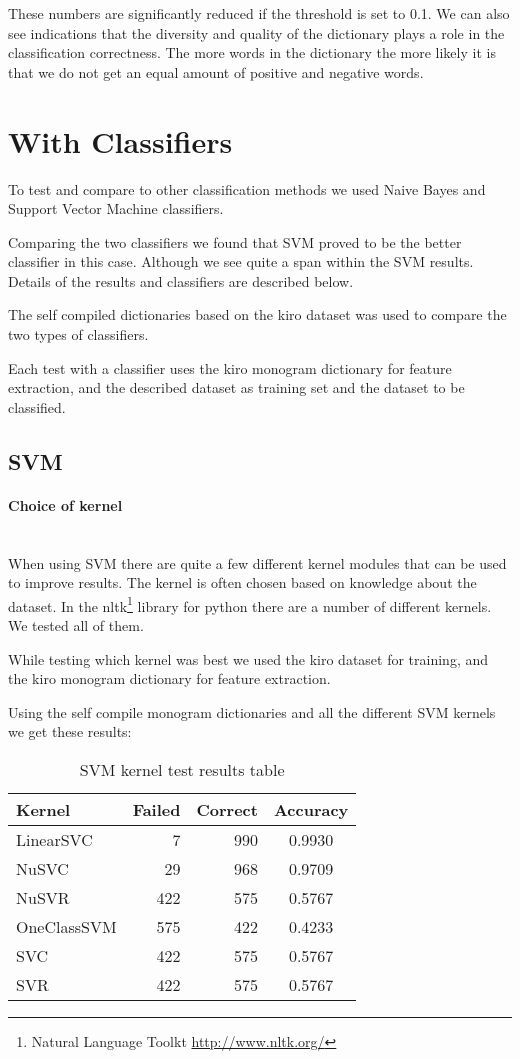 These numbers are significantly reduced if the threshold is set to 0.1.
We can also see indications that the diversity and quality of the dictionary
plays a role in the classification correctness. The more words in the
dictionary the more likely it is that we do not get an equal amount of positive
and negative words. 
%

\section{With Classifiers}\label{sentiment:classifier_classification}
To test and compare to other classification methods we used Naive Bayes and
Support Vector Machine classifiers. 

Comparing the two classifiers we found that SVM proved to be the better
classifier in this case. Although we see quite a span within the SVM results.
Details of the results and classifiers are described below.  

The self compiled dictionaries based on the kiro dataset was used to compare
the two types of classifiers. 

Each test with a classifier uses the kiro monogram dictionary for feature
extraction, and the described dataset as training set and the dataset to be
classified. 

\subsection{SVM}\label{sentiment:svm_classification}
\paragraph{Choice of kernel}
\hspace{0pt}\\
When using SVM there are quite a few different kernel modules that can be used
to improve results. The kernel is often chosen based on knowledge about the
dataset. In the nltk\footnote{Natural Language Toolkt
\url{http://www.nltk.org/}} library for python there are a number of different
kernels. We tested all of them.  

While testing which kernel was best we used the kiro dataset for training, and
the kiro monogram dictionary for feature extraction. 

Using the self compile monogram dictionaries and all the different SVM kernels we get these results:

\begin{table}
\centering
\label{tbl:svm_classifier_kernal_test}
\caption{SVM kernel test results table}
\begin{tabular}{ l r r c }
Kernel & Failed & Correct & Accuracy \\
\hline
LinearSVC & 7 & 990 & 0.9930 \\
NuSVC & 29 & 968 & 0.9709 \\
NuSVR & 422 & 575 & 0.5767 \\
OneClassSVM & 575 & 422 & 0.4233 \\
SVC & 422 & 575 & 0.5767 \\
SVR & 422 & 575 & 0.5767 \\
\end{tabular}
\end{table}

